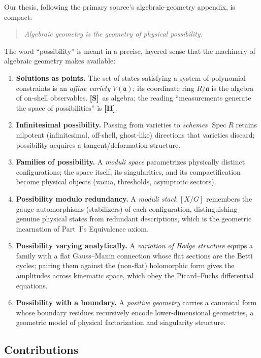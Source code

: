 \documentclass[12pt]{article}
\theoremstyle{definition}
\theoremstyle{remark}
\newcommand{\Spec}{\operatorname{Spec}}
\newcommand{\Ideal}{\mathfrak{a}}
\newcommand{\status}[1]{\textnormal{\textsf{\textbf{[#1]}}}}
\begin{document}
Our thesis, following the primary source's algebraic-geometry appendix, is compact:
\begin{quote}
\emph{Algebraic geometry is the geometry of physical possibility.}
\end{quote}
The word ``possibility'' is meant in a precise, layered sense that the machinery of algebraic
geometry makes available:
\begin{enumerate}
  \item \textbf{Solutions as points.} The set of states satisfying a system of polynomial constraints
  is an \emph{affine variety} $V(\Ideal)$; its coordinate ring $R/\Ideal$ is the algebra of on-shell
  observables. \status{S}\ as algebra; the reading ``measurements generate the space of
  possibilities'' is \status{H}.
  \item \textbf{Infinitesimal possibility.} Passing from varieties to \emph{schemes} $\Spec R$ retains
  nilpotent (infinitesimal, off-shell, ghost-like) directions that varieties discard; possibility
  acquires a tangent/deformation structure.
  \item \textbf{Families of possibility.} A \emph{moduli space} parametrizes physically distinct
  configurations; the space itself, its singularities, and its compactification become physical
  objects (vacua, thresholds, asymptotic sectors).
  \item \textbf{Possibility modulo redundancy.} A \emph{moduli stack} $[X/G]$ remembers the gauge
  automorphisms (stabilizers) of each configuration, distinguishing genuine physical states from
  redundant descriptions, which is the geometric incarnation of Part~I's Equivalence axiom.
  \item \textbf{Possibility varying analytically.} A \emph{variation of Hodge structure} equips a
  family with a flat Gauss--Manin connection whose flat sections are the Betti cycles; pairing them
  against the (non-flat) holomorphic form gives the amplitudes across kinematic space, which obey the
  Picard--Fuchs differential equations.
  \item \textbf{Possibility with a boundary.} A \emph{positive geometry} carries a canonical form whose
  boundary residues recursively encode lower-dimensional geometries, a geometric model of physical
  factorization and singularity structure.
\end{enumerate}

\subsection{Contributions}
\end{document}
